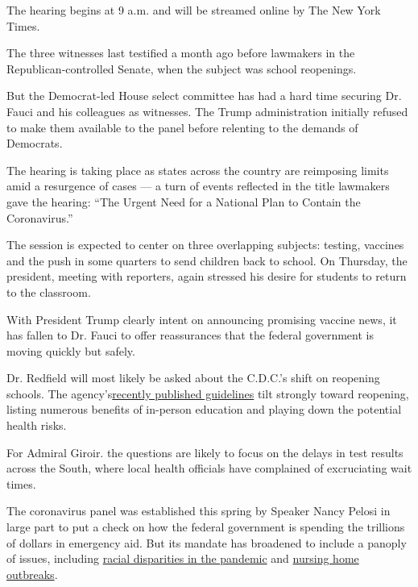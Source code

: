 The hearing begins at 9 a.m. and will be streamed online by The New York
Times.

The three witnesses last testified a month ago before lawmakers in the
Republican-controlled Senate, when the subject was school reopenings.

But the Democrat-led House select committee has had a hard time securing
Dr. Fauci and his colleagues as witnesses. The Trump administration
initially refused to make them available to the panel before relenting
to the demands of Democrats.

The hearing is taking place as states across the country are reimposing
limits amid a resurgence of cases --- a turn of events reflected in the
title lawmakers gave the hearing: ``The Urgent Need for a National Plan
to Contain the Coronavirus.''

The session is expected to center on three overlapping subjects:
testing, vaccines and the push in some quarters to send children back to
school. On Thursday, the president, meeting with reporters, again
stressed his desire for students to return to the classroom.

With President Trump clearly intent on announcing promising vaccine
news, it has fallen to Dr. Fauci to offer reassurances that the federal
government is moving quickly but safely.

Dr. Redfield will most likely be asked about the C.D.C.'s shift on
reopening schools. The
agency's\href{https://www.nytimes3xbfgragh.onion/2020/07/24/health/cdc-schools-coronavirus.html}{recently
published guidelines} tilt strongly toward reopening, listing numerous
benefits of in-person education and playing down the potential health
risks.

For Admiral Giroir. the questions are likely to focus on the delays in
test results across the South, where local health officials have
complained of excruciating wait times.

The coronavirus panel was established this spring by Speaker Nancy
Pelosi in large part to put a check on how the federal government is
spending the trillions of dollars in emergency aid. But its mandate has
broadened to include a panoply of issues, including
\href{https://coronavirus.house.gov/subcommittee-activity/briefings/coronavirus-panel-hold-member-briefing-racial-health-disparities}{racial
disparities in the pandemic} and
\href{https://coronavirus.house.gov/subcommittee-activity/briefings/devastating-impact-coronavirus-crisis-america-s-nursing-homes}{nursing
home outbreaks}.

